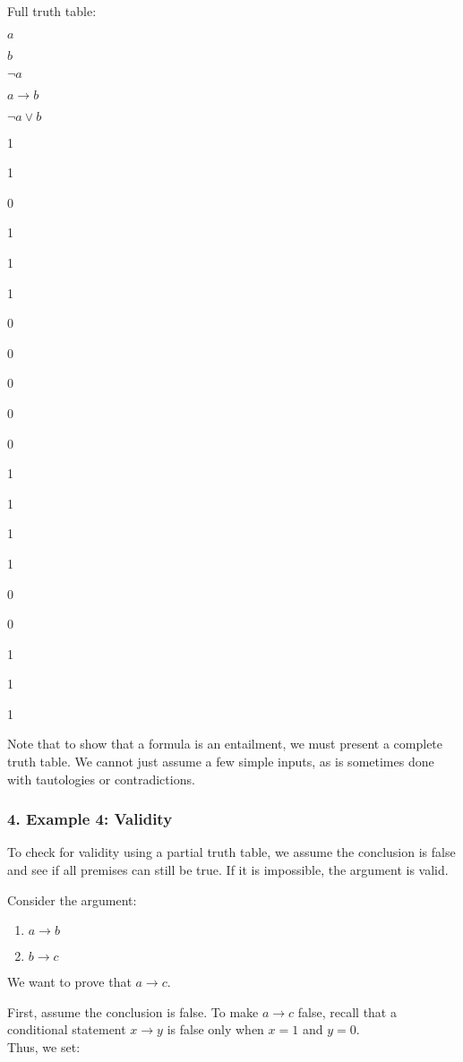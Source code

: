 Full truth table:

\(a\)

\(b\)

\(\neg a\)

\(a \rightarrow b\)

\(\neg a \lor b\)

1

1

0

1

1

1

0

0

0

0

0

1

1

1

1

0

0

1

1

1

Note that to show that a formula is an entailment, we must present a
complete truth table. We cannot just assume a few simple inputs, as is
sometimes done with tautologies or contradictions.

\subsubsection{4. Example 4: Validity}\label{example-4-validity}

To check for validity using a partial truth table, we assume the
conclusion is false and see if all premises can still be true. If it is
impossible, the argument is valid.

Consider the argument:

\begin{enumerate}
\def\labelenumi{\arabic{enumi}.}
\tightlist
\item
  \(a \rightarrow b\)\\
\item
  \(b \rightarrow c\)
\end{enumerate}

We want to prove that \(a \rightarrow c\).

First, assume the conclusion is false. To make \(a \rightarrow c\)
false, recall that a conditional statement \(x \rightarrow y\) is false
only when \(x = 1\) and \(y = 0\).\\
Thus, we set:

